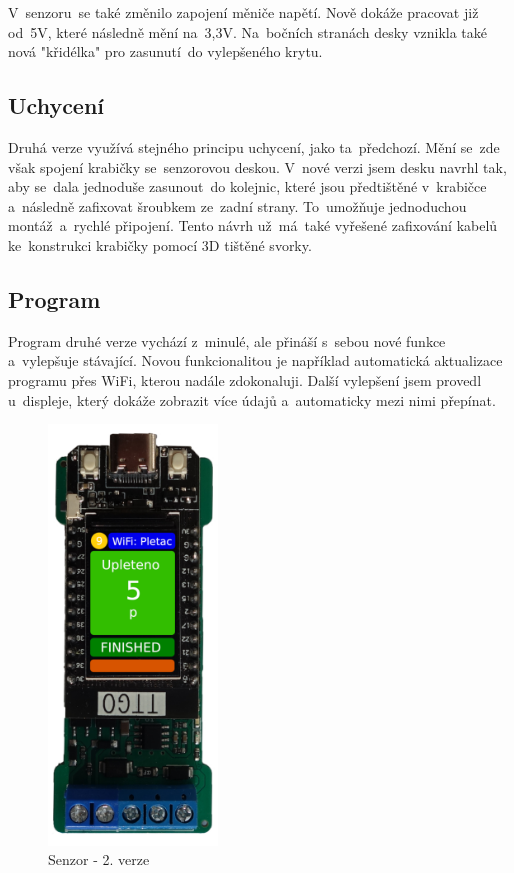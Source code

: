 V~senzoru~se také změnilo zapojení měniče napětí.
Nově dokáže pracovat již od~5V, které následně mění na~3,3V.
Na~bočních stranách desky vznikla také nová "křidélka" pro zasunutí~do vylepšeného krytu.



\subsection{Uchycení}
Druhá verze využívá stejného principu uchycení, jako ta~předchozí. 
Mění se~zde však spojení krabičky se~senzorovou deskou. 
V~nové verzi jsem desku navrhl tak, aby se~dala jednoduše zasunout~do kolejnic, které jsou předtištěné v~krabičce a~následně zafixovat šroubkem ze~zadní strany.
To~umožňuje jednoduchou montáž~a~rychlé připojení.
Tento návrh už~má~také vyřešené zafixování kabelů ke~konstrukci krabičky pomocí 3D tištěné svorky.


\subsection{Program}
Program druhé verze vychází z~minulé, ale přináší s~sebou nové funkce a~vylepšuje stávající.
Novou funkcionalitou je například automatická aktualizace programu přes WiFi, kterou nadále zdokonaluji.
Další vylepšení jsem provedl u~displeje, který dokáže zobrazit více údajů a~automaticky mezi nimi přepínat.

\begin{figure}[htbp]
    \centering
    \includegraphics[width=0.4\textwidth]{img/V2-deska-esp-screen.png}
    \caption{Senzor - 2. verze} 
    \label{fig:SenzorV2}
\end{figure}


\newpage